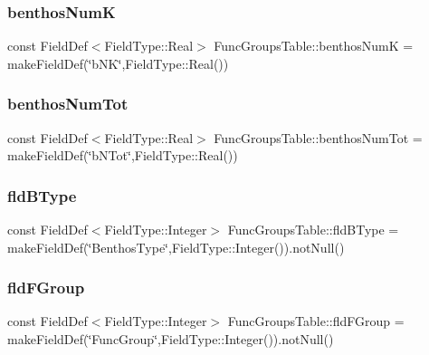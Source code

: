 \subsubsection{\texorpdfstring{benthosNumK}{benthosNumK}}
{\footnotesize\ttfamily const Field\+Def$<$Field\+Type\+::\+Real$>$ Func\+Groups\+Table\+::benthos\+NumK = make\+Field\+Def(\char`\"{}b\+NK\char`\"{},Field\+Type\+::\+Real())}

\mbox{\label{class_func_groups_table_a804729341f824891cbb8f5e79e2192ca}} 
\subsubsection{\texorpdfstring{benthosNumTot}{benthosNumTot}}
{\footnotesize\ttfamily const Field\+Def$<$Field\+Type\+::\+Real$>$ Func\+Groups\+Table\+::benthos\+Num\+Tot = make\+Field\+Def(\char`\"{}b\+N\+Tot\char`\"{},Field\+Type\+::\+Real())}

\mbox{\label{class_func_groups_table_a2f5a3e70984ba21d6d9b50e248d5a902}} 
\subsubsection{\texorpdfstring{fldBType}{fldBType}}
{\footnotesize\ttfamily const Field\+Def$<$Field\+Type\+::\+Integer$>$ Func\+Groups\+Table\+::fld\+B\+Type = make\+Field\+Def(\char`\"{}Benthos\+Type\char`\"{},Field\+Type\+::\+Integer()).not\+Null()}

\mbox{\label{class_func_groups_table_a024e31f16c33f326f035fecdd3c3e59a}} 
\subsubsection{\texorpdfstring{fldFGroup}{fldFGroup}}
{\footnotesize\ttfamily const Field\+Def$<$Field\+Type\+::\+Integer$>$ Func\+Groups\+Table\+::fld\+F\+Group = make\+Field\+Def(\char`\"{}Func\+Group\char`\"{},Field\+Type\+::\+Integer()).not\+Null()}

